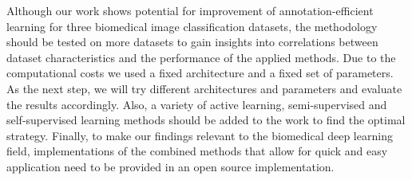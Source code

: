 Although our work shows potential for improvement of annotation-efficient learning for three biomedical image classification datasets, the methodology should be tested on more datasets to gain insights into correlations between dataset characteristics and the performance of the applied methods. Due to the computational costs we used a fixed architecture and a fixed set of parameters. As the next step, we will try different architectures and parameters and evaluate the results accordingly. Also, a variety of active learning, semi-supervised and self-supervised learning methods should be added to the work to find the optimal strategy. Finally, to make our findings relevant to the biomedical deep learning field, implementations of the combined methods that allow for quick and easy application need to be provided in an open source implementation.

